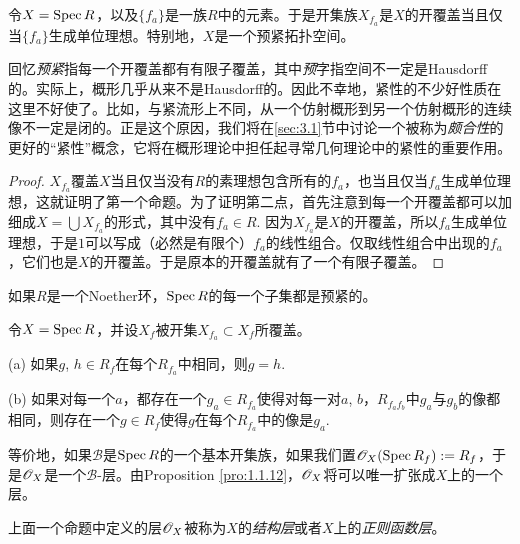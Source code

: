 \begin{lem}\label{lem:1.1.16}
	令$X=\operatorname{Spec} R$，以及$\{f_a\}$是一族$R$中的元素。于是开集族$X_{f_a}$是$X$的开覆盖当且仅当$\{f_a\}$生成单位理想。特别地，$X$是一个预紧拓扑空间。
\end{lem}

回忆\textit{预紧}指每一个开覆盖都有有限子覆盖，其中\textit{预}字指空间不一定是Hausdorff的。实际上，概形几乎从来不是Hausdorff的。因此不幸地，紧性的不少好性质在这里不好使了。比如，与紧流形上不同，从一个仿射概形到另一个仿射概形的连续像不一定是闭的。正是这个原因，我们将在\ref{sec:3.1}节中讨论一个被称为\textit{颇合性}的更好的“紧性”概念，它将在概形理论中担任起寻常几何理论中的紧性的重要作用。

\begin{proof}
	$X_{f_a}$覆盖$X$当且仅当没有$R$的素理想包含所有的$f_a$，也当且仅当$f_a$生成单位理想，这就证明了第一个命题。为了证明第二点，首先注意到每一个开覆盖都可以加细成$X=\bigcup X_{f_a}$的形式，其中没有$f_a\in R$. 因为$X_{f_a}$是$X$的开覆盖，所以$f_a$生成单位理想，于是$1$可以写成（必然是有限个）$f_a$的线性组合。仅取线性组合中出现的$f_a$，它们也是$X$的开覆盖。于是原本的开覆盖就有了一个有限子覆盖。
\end{proof}

\begin{exe}
	如果$R$是一个Noether环，$\operatorname{Spec} R$的每一个子集都是预紧的。
\end{exe}

\begin{pro}\label{pro:1.1.18}
令$X=\operatorname{Spec} R$，并设$X_f$被开集$X_{f_a}\subset X_f$所覆盖。
\begin{compactitem}
\item[{\rm (a)}] 如果$g$, $h\in R_f$在每个$R_{f_a}$中相同，则$g=h$.
\item[{\rm (b)}] 如果对每一个$a$，都存在一个$g_a\in R_{f_a}$使得对每一对$a$, $b$，$R_{f_af_b}$中$g_a$与$g_b$的像都相同，则存在一个$g\in R_f$使得$g$在每个$R_{f_a}$中的像是$g_a$.
\end{compactitem}
\end{pro}

等价地，如果$\mathscr{B}$是$\operatorname{Spec} R$的一个基本开集族，如果我们置$\mathscr{O}_X(\operatorname{Spec} R_f):=R_f$，于是$\mathscr{O}_X$是一个$\mathscr{B}$\hyp 层。由Proposition \ref{pro:1.1.12}，$\mathscr{O}_X$将可以唯一扩张成$X$上的一个层。

\begin{defi}
	上面一个命题中定义的层$\mathscr{O}_X$被称为$X$的\textit{结构层}或者$X$上的\textit{正则函数层}。
\end{defi}

